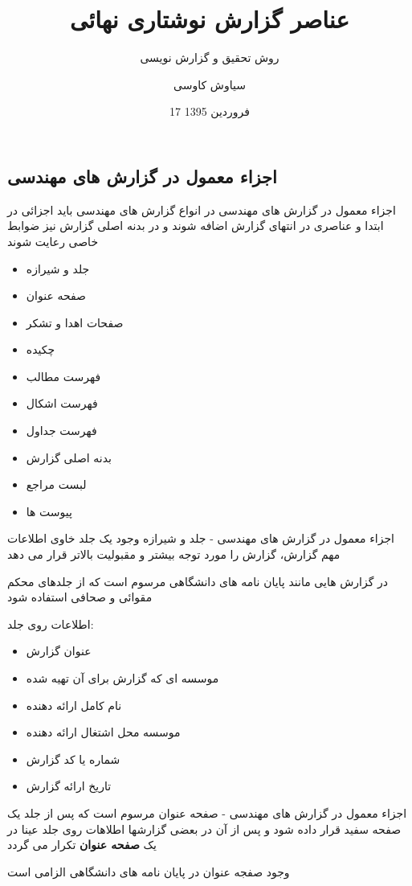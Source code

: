 \documentclass[14pt]{beamer}
\title{عناصر گزارش نوشتاری نهائی}
\subtitle{\color{brown} روش تحقیق و گزارش نویسی}
\date{17 فروردین 1395}
\author{سیاوش کاوسی}
\institute{دانشگاه صنعتی امیرکبیر}
\makeatletter
\newcommand{\rtlist}{\raggedleft\rightskip\@totalleftmargin}
\newcommand{\sectionfontsize}{\fontsize{22pt}{0pt}\selectfont}
\newcommand{\framefontsizelarge}{\fontsize{18pt}{0pt}\selectfont}
\newcommand{\frametitlefontsize}{\fontsize{20pt}{0pt}\selectfont}
\makeatother
\begin{document}
\begin{persian}
	\maketitle
	\everypar{\rightskip\rightmargin}		
	
	\section{\sectionfontsize اجزاء معمول در گزارش های مهندسی}	
	
	\begin{frame}[allowframebreaks]{\frametitlefontsize اجزاء معمول در گزارش های مهندسی}
		\framefontsizelarge
		در انواع گزارش های مهندسی باید اجزائی در ابتدا و عناصری در انتهای گزارش اضافه شوند و در بدنه اصلی گزارش نیز ضوابط خاصی رعایت شوند
		
		\begin{itemize}\rtlist
			\item جلد و شیرازه
			\item صفحه عنوان
			\item صفحات اهدا و تشکر
			\item چکیده
			\item فهرست مطالب
			\item فهرست اشکال
			\item فهرست جداول
			\item بدنه اصلی گزارش
			\item لبست مراجع
			\item پیوست ها
		\end{itemize}
	\end{frame}	
	
	\begin{frame}[plain]{\frametitlefontsize  اجزاء معمول در گزارش های مهندسی - جلد و شیرازه}
		\framefontsizelarge
		وجود یک جلد خاوی اطلاعات مهم گزارش، گزارش را مورد توجه بیشتر و مقبولیت بالاتر قرار می دهد
		
		در گزارش هایی مانند پایان نامه های دانشگاهی مرسوم است که از جلدهای محکم مقوائی و صحافی استفاده شود
		
		اطلاعات روی جلد:
		\begin{itemize}\rtlist
			\item عنوان گزارش
			\item موسسه ای که گزارش برای آن تهیه شده
			\item نام کامل ارائه دهنده
			\item موسسه محل اشتغال ارائه دهنده
			\item شماره یا کد گزارش
			\item تاریخ ارائه گزارش
		\end{itemize}
	\end{frame}	
	
	\begin{frame}[plain]{\frametitlefontsize  اجزاء معمول در گزارش های مهندسی - صفحه عنوان}
		\framefontsizelarge
		مرسوم است که پس از جلد یک صفحه سفید قرار داده شود و پس از آن در بعضی گزارشها اطلاهات روی جلد عینا در یک \textbf{صفحه عنوان} تکرار می گردد
		
		وجود صفجه عنوان در پایان نامه های دانشگاهی الزامی است
	\end{frame}	
	
\end{persian}
\end{document}
